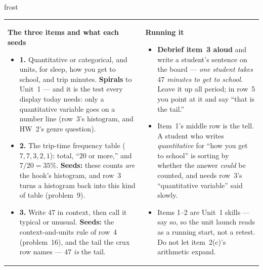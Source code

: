 \documentclass[10pt]{article}
\begin{document}
\begin{fixedskillbox}{frost}
\begin{tabularx}{\linewidth}{@{}X X@{}}
\begin{minipage}[t]{\linewidth}\vspace{0pt}
    \textbf{The three items and what each seeds}
    \begin{itemize}[leftmargin=1.1em, itemsep=1pt, topsep=2pt]
      \item \textbf{1.} Quantitative or categorical, and units, for sleep, how you get to
            school, and trip minutes. \textbf{Spirals} to Unit~1 --- and it is the test every
            display today needs: only a quantitative variable goes on a number line (row~3's
            histogram, and HW~2's genre question).
      \item \textbf{2.} The trip-time frequency table ($7, 7, 3, 2, 1$): total, ``$20$ or more,''
            and $7/20 = 35\%$. \textbf{Seeds:} these counts \emph{are} the hook's histogram,
            and row~3 turns a histogram back into this kind of table (problem~9).
      \item \textbf{3.} Write $47$ in context, then call it typical or unusual. \textbf{Seeds:} the
            context-and-units rule of row~4 (problem~16), and the tail the crux row names
            --- $47$ \emph{is} the tail.
    \end{itemize}
\end{minipage}
&
\begin{minipage}[t]{\linewidth}\vspace{0pt}
    \textbf{Running it}
    \begin{itemize}[leftmargin=1.1em, itemsep=1pt, topsep=2pt]
      \item \textbf{Debrief item~3 aloud} and write a student's sentence on the board ---
            \emph{one student takes $47$ minutes to get to school}. Leave it up all period;
            in row~5 you point at it and say ``that is the tail.''
      \item Item~1's middle row is the tell. A student who writes \emph{quantitative} for ``how
            you get to school'' is sorting by whether the answer \emph{could} be counted, and
            needs row~3's ``quantitative variable'' said slowly.
      \item Items 1--2 are Unit~1 skills --- say so, so the unit launch reads as a running
            start, not a retest. Do not let item~2(c)'s arithmetic expand.
    \end{itemize}
\end{minipage}
\end{tabularx}
\end{fixedskillbox}
\end{document}
